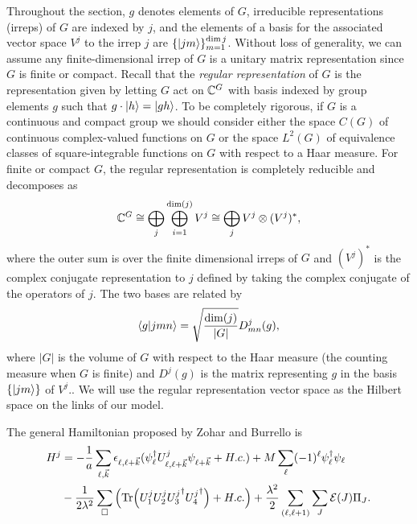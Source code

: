 \documentclass[10pt,reqno]{amsart}
\numberwithin{equation}{section}
\begin{document}
	Throughout the section, $g$ denotes elements of $G$, irreducible representations (irreps) of $G$ are indexed by $j$, and the elements of a basis for the associated vector space $V^j$ to the irrep $j$ are $\{\ket{jm} \}_{m=1}^{\dim j}$.
	Without loss of generality, we can assume any finite-dimensional irrep of $G$ is a unitary matrix representation since $G$ is finite or compact.
	Recall that the \emph{regular representation}  
	of $G$ is the representation given by letting $G$ act on $\mathbb{C}^{G}$ with basis indexed by group elements $g$ such that $g\cdot \ket{h} = \ket{gh}$. 
	To be completely rigorous, if $G$ is a continuous and compact group we should consider either the space $C(G)$ of continuous complex-valued functions on $G$ or the space $L^2(G)$ of equivalence classes of square-integrable functions on $G$ with respect to a Haar measure.
	For finite or compact $G$, the regular representation is completely reducible and decomposes as
	\begin{equation}\label{eq:reg_rep_decomp}
		\mathbb{C}^{G}\cong\bigoplus_j \bigoplus_{i=1}^{\dim (j)} V^j \cong \bigoplus_j V^j \otimes (V^j)^* ,
	\end{equation}
	where the outer sum is over the finite dimensional irreps of $G$ and $(V^j)^*$ is the complex conjugate representation to $j$ defined by taking the complex conjugate of the operators of $j$.
	The two bases are related by
	\begin{equation}\label{eq:group_rep_basis_relation}
		\braket{g}{jmn}=\sqrt{\frac{\dim(j)}{|G|}}D^j_{mn}(g),
	\end{equation}
	where $|G|$ is the volume of $G$ with respect to the Haar measure (the counting measure when $G$ is finite) and $D^j(g)$ is the matrix representing $g$ in the basis $\{\ket{jm}\}$ of $V^j$..
	We will use the regular representation vector space as the Hilbert space on the links of our model.
	
	The general Hamiltonian proposed by Zohar and Burrello is
	\begin{align}\label{eq:zohar_hamiltonian}
	H^j&=-\frac{1}{a}\sum_{\ell,\vec{k}} \epsilon_{\ell,\ell+\vec{k}}(\psi_\ell^\dagger U_{\ell,\ell+\vec{k}}^j\psi_{\ell+\vec{k}}+H.c.) + M\sum_\ell (-1)^\ell \psi_\ell^\dagger\psi_\ell \nonumber\\ 
	&- \frac{1}{2\lambda^2} \sum_{\Box} \left(\Tr(U_1^j U_2^j {U_3^j}^\dagger {U_4^j}^\dagger) + H.c.\right) + \frac{\lambda^2}{2} \sum_{(\ell,\ell+1)} \sum_{J} \mathcal{E}(J)\Pi_J.
	\end{align}
	
\end{document}
